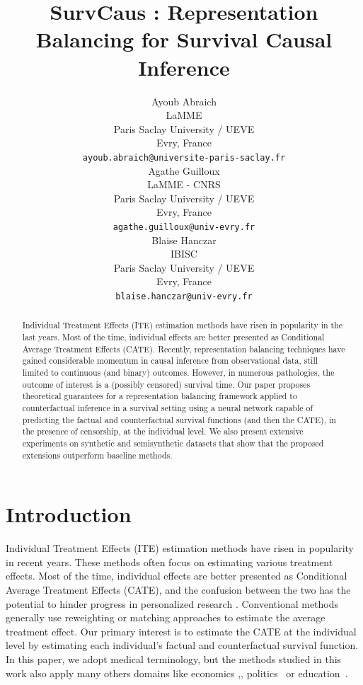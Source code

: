 \documentclass[12pt]{article}
\title{SurvCaus : Representation Balancing for Survival Causal Inference}
\author{
  Ayoub Abraich \\
  LaMME \\
  Paris Saclay University / UEVE \\
  Evry, France\\
  \texttt{ayoub.abraich@universite-paris-saclay.fr} \\
   \And
  Agathe Guilloux \\
  LaMME - CNRS\\
  Paris Saclay University / UEVE \\
  Evry, France\\
  \texttt{agathe.guilloux@univ-evry.fr} \\
  \And
  Blaise Hanczar \\
  IBISC \\
  Paris Saclay University / UEVE \\
  Evry, France\\
  \texttt{blaise.hanczar@univ-evry.fr} 
}
\theoremstyle{plain}
\theoremstyle{definition}
\theoremstyle{remark}
\begin{document}
\maketitle



\begin{abstract}
Individual Treatment Effects (ITE) estimation methods have risen in popularity in the last years. Most of the time, individual effects are better presented as Conditional Average Treatment Effects (CATE). Recently, representation balancing techniques have gained considerable momentum in causal inference from observational data, still limited to continuous (and binary) outcomes. However, in numerous pathologies, the outcome of interest is a (possibly censored) survival time.
Our paper proposes theoretical guarantees for a representation balancing framework applied to counterfactual inference in a survival setting using a neural network capable of predicting the factual and counterfactual survival functions (and then the CATE), in the presence of censorship, at the individual level. We also present extensive experiments on synthetic and semisynthetic datasets that show that the proposed extensions outperform baseline methods.
\end{abstract}



\section{Introduction}
\label{intro}
Individual Treatment Effects (ITE) estimation methods have risen in popularity in recent years. These methods often focus on estimating various treatment effects. Most of the time, individual effects are better presented as Conditional Average Treatment Effects (CATE), and the confusion between the two has the potential to hinder progress in personalized research \cite{Brian2021IndividualComparisons}. Conventional methods generally use reweighting or matching approaches to estimate the average treatment effect. Our primary interest is to estimate the CATE at the individual level by estimating each individual's factual and counterfactual survival function. In this paper, we adopt medical terminology, but the methods studied in this work also apply many others domains like economics \cite{Banerjee2009TheEconomics},\cite{SibekoExperimentalAfrica}, politics~\cite{steinberg2004new} or education~\cite{morrison2016searching}.
\end{document}
